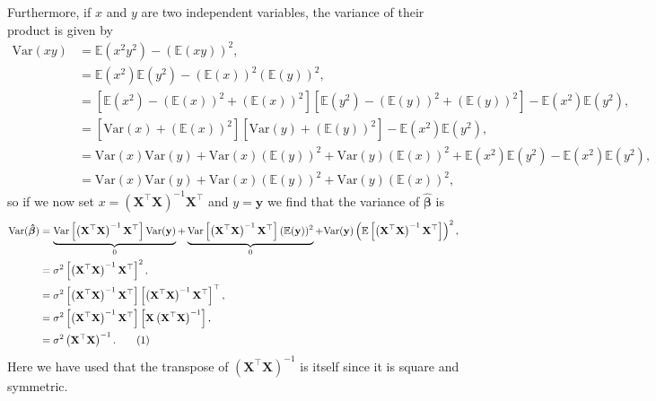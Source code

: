 \documentclass[aps,pra,english,notitlepage,reprint,nofootinbib]{revtex4-1}  %
\newcommand\numberthis{\addtocounter{equation}{1}\tag{\theequation}}
\begin{document}
Furthermore, if $x$ and $y$ are two independent variables, the variance of their product is given by
\begin{align*}
\textrm{Var}(xy) &= \mathbb{E}(x^2y^2)-(\mathbb{E}(xy))^2, \\
&= \mathbb{E}(x^2)\mathbb{E}(y^2) - \left(\mathbb{E}(x)\right)^2\left(\mathbb{E}(y)\right)^2,
\\
&= \left[\mathbb{E}(x^2) - \left(\mathbb{E}(x)\right)^2 + \left(\mathbb{E}(x)\right)^2\right]\left[\mathbb{E}(y^2) - \left(\mathbb{E}(y)\right)^2 + \left(\mathbb{E}(y)\right)^2\right] - \mathbb{E}(x^2)\mathbb{E}(y^2),
\\
&= \left[\textrm{Var}(x) + \left(\mathbb{E}(x)\right)^2\right]\left[\textrm{Var}(y) + \left(\mathbb{E}(y)\right)^2\right] - \mathbb{E}(x^2)\mathbb{E}(y^2), \\
&= \textrm{Var}(x)\textrm{Var}(y) + \textrm{Var}(x)(\mathbb{E}(y))^2 + \textrm{Var}(y)(\mathbb{E}(x))^2 +\mathbb{E}(x^2)\mathbb{E}(y^2)- \mathbb{E}(x^2)\mathbb{E}(y^2),
\\
&= \textrm{Var}(x)\textrm{Var}(y) + \textrm{Var}(x)(\mathbb{E}(y))^2 + \textrm{Var}(y)(\mathbb{E}(x))^2,
\end{align*}
so if we now set $x=\left(\mathbf{X}^\top\mathbf{X}\right)^{-1}\mathbf{X}^\top$ and $y=\mathbf{y}$ we find that the variance of $\boldsymbol{\hat{\beta}}$ is
\begin{align*}
\textrm{Var}(\boldsymbol{\hat{\beta}}) 
&= \underbrace{\textrm{Var}\left[\left(\mathbf{X}^\top\mathbf{X}\right)^{-1}\mathbf{X}^\top\right]\textrm{Var}(\mathbf{y})}_0 
+ \underbrace{\textrm{Var}\left[\left(\mathbf{X}^\top\mathbf{X}\right)^{-1}\mathbf{X}^\top\right](\mathbb{E}(\mathbf{y}))^2}_{0} 
+ \textrm{Var}(\mathbf{y})\left(\mathbb{E}\left[\left(\mathbf{X}^\top\mathbf{X}\right)^{-1}\mathbf{X}^\top\right]\right)^2,
\\
&= \sigma^2\left[\left(\mathbf{X}^\top\mathbf{X}\right)^{-1}\mathbf{X}^\top\right]^2,
\\
&= \sigma^2\left[\left(\mathbf{X}^\top\mathbf{X}\right)^{-1}\mathbf{X}^\top\right]\left[\left(\mathbf{X}^\top\mathbf{X}\right)^{-1}\mathbf{X}^\top\right]^\top,
\\
&= \sigma^2\left[\left(\mathbf{X}^\top\mathbf{X}\right)^{-1}\mathbf{X}^\top\right]\left[\mathbf{X}\left(\mathbf{X}^\top\mathbf{X}\right)^{-1}\right],
\\
&= \sigma^2\left(\mathbf{X}^\top\mathbf{X}\right)^{-1}. \numberthis \label{appeq:var beta OLS}
\end{align*}
Here we have used that the transpose of $\left(\mathbf{X}^\top\mathbf{X}\right)^{-1}$ is itself since it is square and symmetric.
\end{document}
